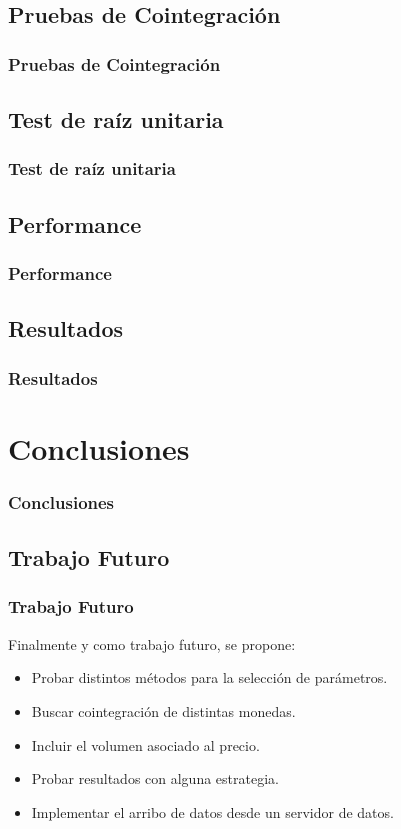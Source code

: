 \documentclass{beamer}
\begin{document}
        \subsection{Pruebas de Cointegración}
            \begin{frame}
            \frametitle{Pruebas de Cointegración}
            \end{frame}
        \subsection{Test de raíz unitaria}
            \begin{frame}
            \frametitle{Test de raíz unitaria}
            \end{frame}
        \subsection{Performance}
            \begin{frame}
            \frametitle{Performance}
            \end{frame}
        \subsection{Resultados}
            \begin{frame}
            \frametitle{Resultados}
            \end{frame}
    \section{Conclusiones}
            \begin{frame}
            \frametitle{Conclusiones}
            \end{frame}
        \subsection{Trabajo Futuro}
            \begin{frame}
            \frametitle{Trabajo Futuro}
            \newpage
            Finalmente y como trabajo futuro, se propone:
            \begin{itemize}
             \item Probar distintos métodos para la selección de parámetros. 
             \item Buscar cointegración de distintas monedas. 
             \item Incluir el volumen asociado al precio.
             \item Probar resultados con alguna estrategia. 
             \item Implementar el arribo de datos desde un servidor de datos. 
            \end{itemize}

            \end{frame}
	
\end{document}
